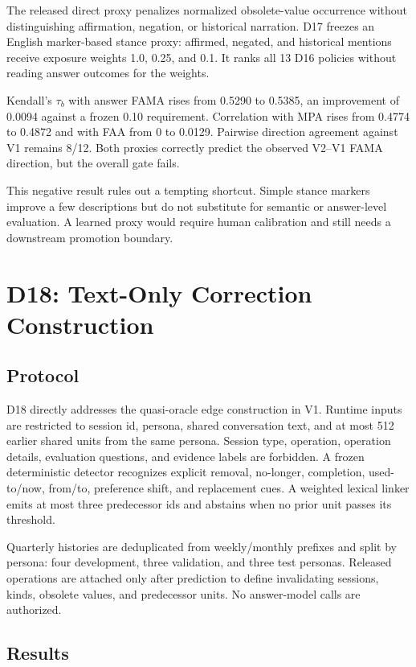 \documentclass[10pt]{article}
\newcommand{\vone}{\textsc{V1}\xspace}
\newcommand{\vtwo}{\textsc{V2}\xspace}
\begin{document}
The released direct proxy penalizes normalized obsolete-value occurrence without distinguishing affirmation, negation, or historical narration. D17 freezes an English marker-based stance proxy: affirmed, negated, and historical mentions receive exposure weights 1.0, 0.25, and 0.1. It ranks all 13 D16 policies without reading answer outcomes for the weights.

Kendall's $\tau_b$ with answer FAMA rises from 0.5290 to 0.5385, an improvement of 0.0094 against a frozen 0.10 requirement. Correlation with MPA rises from 0.4774 to 0.4872 and with FAA from 0 to 0.0129. Pairwise direction agreement against \vone remains 8/12. Both proxies correctly predict the observed \vtwo--\vone FAMA direction, but the overall gate fails.

This negative result rules out a tempting shortcut. Simple stance markers improve a few descriptions but do not substitute for semantic or answer-level evaluation. A learned proxy would require human calibration and still needs a downstream promotion boundary.

\section{D18: Text-Only Correction Construction}
\label{sec:d18}

\subsection{Protocol}

D18 directly addresses the quasi-oracle edge construction in V1. Runtime inputs are restricted to session id, persona, shared conversation text, and at most 512 earlier shared units from the same persona. Session type, operation, operation details, evaluation questions, and evidence labels are forbidden. A frozen deterministic detector recognizes explicit removal, no-longer, completion, used-to/now, from/to, preference shift, and replacement cues. A weighted lexical linker emits at most three predecessor ids and abstains when no prior unit passes its threshold.

Quarterly histories are deduplicated from weekly/monthly prefixes and split by persona: four development, three validation, and three test personas. Released operations are attached only after prediction to define invalidating sessions, kinds, obsolete values, and predecessor units. No answer-model calls are authorized.

\subsection{Results}
\end{document}
